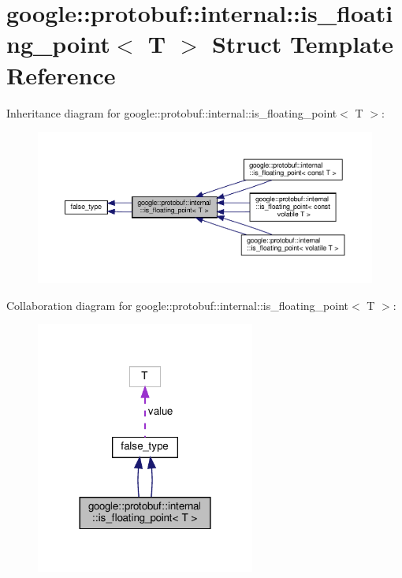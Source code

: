 \hypertarget{structgoogle_1_1protobuf_1_1internal_1_1is__floating__point}{}\section{google\+:\+:protobuf\+:\+:internal\+:\+:is\+\_\+floating\+\_\+point$<$ T $>$ Struct Template Reference}
\label{structgoogle_1_1protobuf_1_1internal_1_1is__floating__point}


Inheritance diagram for google\+:\+:protobuf\+:\+:internal\+:\+:is\+\_\+floating\+\_\+point$<$ T $>$\+:
\nopagebreak
\begin{figure}[H]
\begin{center}
\leavevmode
\includegraphics[width=350pt]{structgoogle_1_1protobuf_1_1internal_1_1is__floating__point__inherit__graph}
\end{center}
\end{figure}


Collaboration diagram for google\+:\+:protobuf\+:\+:internal\+:\+:is\+\_\+floating\+\_\+point$<$ T $>$\+:
\nopagebreak
\begin{figure}[H]
\begin{center}
\leavevmode
\includegraphics[width=204pt]{structgoogle_1_1protobuf_1_1internal_1_1is__floating__point__coll__graph}
\end{center}
\end{figure}
